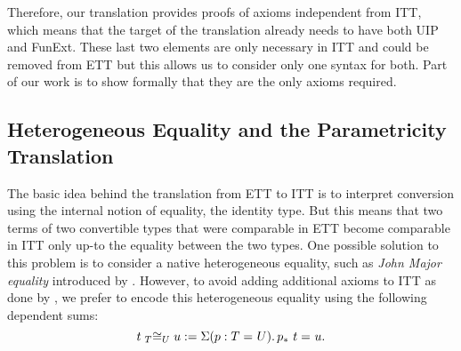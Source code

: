 Therefore, our translation provides proofs of axioms independent from
ITT, which means that the target of the translation already needs to
have both UIP and FunExt.
These last two elements are only necessary in ITT and could be removed from ETT
but this allows us to consider only one syntax for both.
%
Part of our work is to show formally that they are the only axioms
required.

\subsection{Heterogeneous Equality and the Parametricity Translation}
\label{sec:heteq}

The basic idea behind the translation from ETT to ITT is to interpret
conversion using the internal notion of equality, \ie the identity type.
%
But this means that two terms of two convertible types that were comparable
in ETT become comparable in ITT only up-to the equality between the
two types. One possible solution to this problem is to consider a
native heterogeneous equality, such as \emph{John Major
equality} introduced by .
%
However, to avoid adding additional axioms to ITT as done by
, we prefer to encode this
heterogeneous equality using the following dependent sums:
$$\Heq{T}{t}{U}{u} := \Sum{p:\Eq{}{T}{U}} \Eq{}{\transpo{p}\ t}{u}.$$
%


